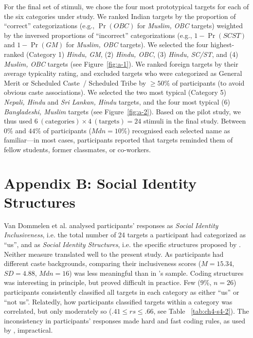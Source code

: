 \documentclass[12pt, a4paper]{article}
\begin{document}
For the final set of stimuli, we chose the four most prototypical targets for each of the six categories under study. We ranked Indian targets by the proportion of ``correct'' categorizations (e.g., $\Pr(\textit{OBC})$ for \emph{Muslim, OBC} targets) weighted by the inversed proportions of ``incorrect'' categorizations (e.g., $1 - \Pr(\textit{SCST})$ and $1 - \Pr(\textit{GM})$ for \emph{Muslim, OBC} targets). We selected the four highest-ranked (Category 1) \emph{Hindu, GM}, (2) \emph{Hindu, OBC}, (3) \emph{Hindu, SC/ST}, and (4) \emph{Muslim, OBC} targets (see Figure~\ref{fig:a-1}). We ranked foreign targets by their average typicality rating, and excluded targets who were categorized as General Merit or Scheduled Caste~/ Scheduled Tribe by $\ge 50\%$ of participants (to avoid obvious caste associations). We selected the two most typical (Category 5) \emph{Nepali, Hindu} and \emph{Sri Lankan, Hindu} targets, and the four most typical (6) \emph{Bangladeshi, Muslim} targets (see Figure~\ref{fig:a-2}). Based on the pilot study, we thus used $6~(\text{categories}) \times 4~(\text{targets}) = 24$ stimuli in the final study. Between $0\%$ and $44\%$ of participants ($\textit{Mdn} = 10\%$) recognised each selected name as familiar---in most cases, participants reported that targets reminded them of fellow students, former classmates, or co-workers.

\section{Appendix B: Social Identity Structures}

Van Dommelen et al. \citeyear{dommelen_construing_2015} analysed participants' responses as \emph{Social Identity Inclusiveness}, i.e. the total number of 24 targets a participant had categorized as ``us'', and as \emph{Social Identity Structures}, i.e. the specific structures proposed by . Neither measure translated well to the present study. As participants had different caste backgrounds, comparing their inclusiveness scores ($M = 15.34$, $\textit{SD} = 4.88$, $\textit{Mdn} = 16$) was less meaningful than in \citeauthor{dommelen_construing_2015}'s sample. Coding structures was interesting in principle, but proved difficult in practice.  Few (9\%, $n = 26$) participants consistently classified all targets in each category as either ``us'' or ``not us''. Relatedly, how participants classified targets within a category was correlated, but only moderately so ($.41 \leq rs \leq.66$, see Table ~\ref{tab:ch4-s4-2}). The inconsistency in participants' responses made hard and fast coding rules, as used by \citeauthor{dommelen_construing_2015}, impractical.
\end{document}
